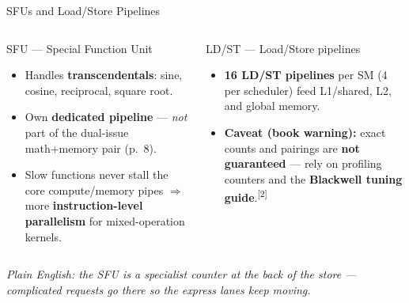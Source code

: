 \documentclass[aspectratio=169]{beamer}
\newcommand{\kw}[1]{\textbf{\textcolor{kwblue}{#1}}}
\newcommand{\pe}[1]{\par{\setlength{\fboxsep}{2.5pt}\noindent\colorbox{navy!9}{\parbox{\dimexpr\textwidth-5pt\relax}{\footnotesize\itshape Plain English: #1}}}}
\newcommand{\refmark}[1]{\textsuperscript{[#1]}}
\begin{document}
\begin{frame}{SFUs and Load/Store Pipelines}
  \begin{columns}[t]
    \begin{block}{SFU --- Special Function Unit}
      \begin{itemize}\small
        \item Handles \kw{transcendentals}: sine, cosine, reciprocal, square root.
        \item Own \kw{dedicated pipeline} --- \emph{not} part of the dual-issue math+memory pair (p.~8).
        \item Slow functions never stall the core compute/memory pipes $\Rightarrow$
              more \kw{instruction-level parallelism} for mixed-operation kernels.
      \end{itemize}
    \end{block}
    \begin{block}{LD/ST --- Load/Store pipelines}
      \begin{itemize}\small
        \item \kw{16 LD/ST pipelines} per SM (4 per scheduler) feed L1/shared, L2, and global memory.
        \item \kw{Caveat (book warning):} exact counts and pairings are \kw{not guaranteed} ---
              rely on profiling counters and the \kw{Blackwell tuning guide}.\refmark{2}
      \end{itemize}
    \end{block}
  \end{columns}
  \pe{the SFU is a specialist counter at the back of the store --- complicated requests go there so the express lanes keep moving.}
\end{frame}
\end{document}
